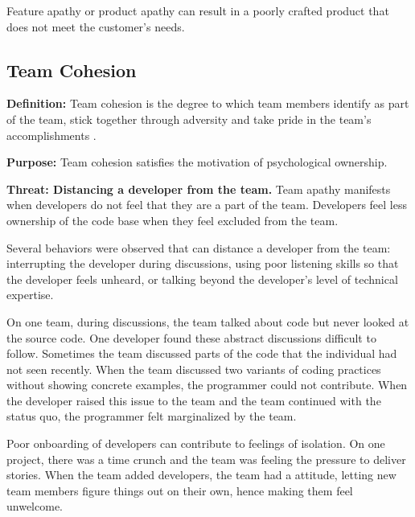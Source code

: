 
Feature apathy or product apathy can result in a poorly crafted product that does not meet the customer's needs.

\subsection{Team Cohesion}
\textbf{Definition:} Team cohesion is the degree to which team members identify as part of the team, stick together through adversity and take pride in the team's accomplishments \cite{Bollen1990Perceived, Beal2003Cohesion, Whitworth2007Motivation}.

\textbf{Purpose:} Team cohesion satisfies the  motivation of psychological ownership.

\textbf{Threat: Distancing a developer from the team.} Team apathy manifests when developers do not feel that they are a part of the team. Developers feel less ownership of the code base when they feel excluded from the team.

Several behaviors were observed that can distance a developer from the team: interrupting the developer during discussions, using poor listening skills so that the developer feels unheard, or talking beyond the developer's level of technical expertise. 

On one team, during discussions, the team talked about code but never looked at the source code. One developer found these abstract discussions difficult to follow. Sometimes the team discussed parts of the code that the individual had not seen recently. When the team discussed two variants of coding practices without showing concrete examples, the programmer could not contribute. When the developer raised this issue to the team and the team continued with the status quo, the programmer felt marginalized by the team.

Poor onboarding of developers can contribute to feelings of isolation. On one project, there was a time crunch and the team was feeling the pressure to deliver stories. When the team added developers, the team had a  attitude, letting new team members figure things out on their own, hence making them feel unwelcome.

